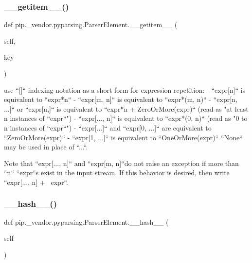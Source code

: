 \subsubsection{\texorpdfstring{\+\_\+\+\_\+getitem\+\_\+\+\_\+()}{\_\_getitem\_\_()}}
{\footnotesize\ttfamily def pip.\+\_\+vendor.\+pyparsing.\+Parser\+Element.\+\_\+\+\_\+getitem\+\_\+\+\_\+ (\begin{DoxyParamCaption}\item[{}]{self,  }\item[{}]{key }\end{DoxyParamCaption})}

\begin{DoxyVerb}use ``[]`` indexing notation as a short form for expression repetition:
 - ``expr[n]`` is equivalent to ``expr*n``
 - ``expr[m, n]`` is equivalent to ``expr*(m, n)``
 - ``expr[n, ...]`` or ``expr[n,]`` is equivalent
      to ``expr*n + ZeroOrMore(expr)``
      (read as "at least n instances of ``expr``")
 - ``expr[..., n]`` is equivalent to ``expr*(0, n)``
      (read as "0 to n instances of ``expr``")
 - ``expr[...]`` and ``expr[0, ...]`` are equivalent to ``ZeroOrMore(expr)``
 - ``expr[1, ...]`` is equivalent to ``OneOrMore(expr)``
 ``None`` may be used in place of ``...``.

Note that ``expr[..., n]`` and ``expr[m, n]``do not raise an exception
if more than ``n`` ``expr``s exist in the input stream.  If this behavior is
desired, then write ``expr[..., n] + ~expr``.\end{DoxyVerb}
 \mbox{\label{classpip_1_1__vendor_1_1pyparsing_1_1ParserElement_a0a833f0157c56262b4cdd88a235ebd5a}} 
\subsubsection{\texorpdfstring{\+\_\+\+\_\+hash\+\_\+\+\_\+()}{\_\_hash\_\_()}}
{\footnotesize\ttfamily def pip.\+\_\+vendor.\+pyparsing.\+Parser\+Element.\+\_\+\+\_\+hash\+\_\+\+\_\+ (\begin{DoxyParamCaption}\item[{}]{self }\end{DoxyParamCaption})}

